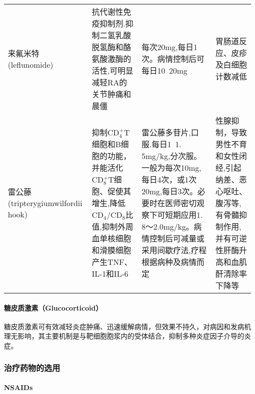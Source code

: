 \begin{longtable}[]{p{3cm}p{4cm}p{4cm}p{4cm}}
    来氟米特(leflunomide)                                                                                                                                                                      & 抗代谢性免疫抑制剂.抑制二氢乳酸脱氢酶和酪氨酸激酶的活性,可明显减轻RA的关节肿痛和晨僵                                                    & 每次20mg,每日1次。病情控制后可每日10~20mg                                                                                                                                          & 胃肠道反应、皮疹及白细胞计数减低\\
    雷公藤(tripterygiumwilfordii hook)
                                                                                                                                                                                               & 抑制CD$_4^+$T细胞和B细胞的功能，并能活化CD$_8^+$T细胞、促使其增生,降低CD$_4$/CD$_8$比值,抑制外周血单核细胞和滑膜细胞产生TNF、IL-1和IL-6 &
    雷公藤多苷片,口服.每日1~1. 5mg/kg,分次服。一般为每次10mg,每日4次，或1次20mg,每日3次。必要时在医师密切观察下可短期应用1. 8～2.0mg/kg。病情控制后可减量或采用间歇疗法,疗程根据病种及病情而定 & 性腺抑制，导致男性不育和女性闭经,引起纳差、恶心呕吐、腹泻等,有骨髓抑制作用,并有可逆性肝酶升高和血肌酐清除率下降等                                                                                                                                                                                                                                                                                                                                                           \\
    \bottomrule
\end{longtable}


\paragraph{糖皮质激素（Glucocorticoid）}

糖皮质激素可有效减轻炎症肿痛、迅速缓解病情，但效果不持久，对病因和发病机理无影响，其主要机制是与靶细胞胞浆内的受体结合，抑制多种炎症因子介导的炎症。

\subsubsection{治疗药物的选用}
\paragraph{NSAIDs}

